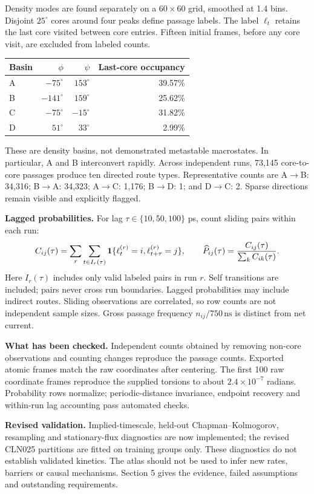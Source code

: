 \documentclass[11pt]{article}
\begin{document}
Density modes are found separately on a $60\times60$ grid, smoothed at 1.4 bins.
Disjoint $25^\circ$ cores around four peaks define passage labels.
The label $\ell_t$ retains the last core visited between core entries.
Fifteen initial frames, before any core visit, are excluded from labeled counts.

\begin{center}
\begin{tabular}{lrrr}
\toprule Basin & $\phi$ & $\psi$ & Last-core occupancy\\\midrule
A & $-75^\circ$ & $153^\circ$ & 39.57\%\\
B & $-141^\circ$ & $159^\circ$ & 25.62\%\\
C & $-75^\circ$ & $-15^\circ$ & 31.82\%\\
D & $51^\circ$ & $33^\circ$ & 2.99\%\\\bottomrule
\end{tabular}
\end{center}
These are density basins, not demonstrated metastable macrostates.
In particular, A and B interconvert rapidly.
Across independent runs, 73,145 core-to-core passages produce ten directed
route types. Representative counts are A$\to$B: 34,316;
B$\to$A: 34,323; A$\to$C: 1,176; B$\to$D: 1; and D$\to$C: 2.
Sparse directions remain visible and explicitly flagged.

\textbf{Lagged probabilities.}
For lag $\tau\in\{10,50,100\}$ ps, count sliding pairs within each run:
\[
 C_{ij}(\tau)=\sum_r\sum_{t\in I_r(\tau)}
 {\bf1}\{\ell_t^{(r)}=i,\ell_{t+\tau}^{(r)}=j\},
 \qquad
 \widehat P_{ij}(\tau)=\frac{C_{ij}(\tau)}{\sum_k C_{ik}(\tau)}.
\]
Here $I_r(\tau)$ includes only valid labeled pairs in run $r$.
Self transitions are included; pairs never cross run boundaries.
Lagged probabilities may include indirect routes. Sliding observations
are correlated, so row counts are not independent sample sizes.
Gross passage frequency $n_{ij}/750\,\mathrm{ns}$ is distinct from net current.

\textbf{What has been checked.}
Independent counts obtained by removing non-core observations and counting
changes reproduce the passage counts. Exported atomic frames match the raw
coordinates after centering. The first 100 raw coordinate frames reproduce
the supplied torsions to about $2.4\times10^{-7}$ radians.
Probability rows normalize; periodic-distance invariance, endpoint
recovery and within-run lag accounting pass automated checks.

\textbf{Revised validation.}
Implied-timescale, held-out Chapman--Kolmogorov, resampling and stationary-flux
diagnostics are now implemented; the revised CLN025 partitions are fitted
on training groups only. These diagnostics do not establish validated kinetics.
The atlas should not be used to infer new rates, barriers or causal mechanisms.
Section 5 gives the evidence, failed assumptions and outstanding requirements.
\end{document}
